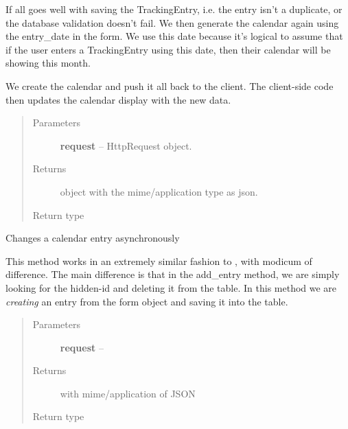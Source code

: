 \documentclass[letterpaper,10pt,english]{sphinxmanual}
\begin{document}
\begin{fulllineitems}
If all goes well with saving the TrackingEntry, i.e. the entry isn't a
duplicate, or the database validation doesn't fail. We then generate the
calendar again using the entry\_date in the form. We use this date because
it's logical to assume that if the user enters a TrackingEntry using this
date, then their calendar will be showing this month.

We create the calendar and push it all back to the client. The client-side
code then updates the calendar display with the new data.
\begin{quote}\begin{description}
\item[{Parameters}] \leavevmode
\textbf{request} -- HttpRequest object.

\item[{Returns}] \leavevmode
{} object with the mime/application type as
json.

\item[{Return type}] \leavevmode
{}

\end{description}\end{quote}

\end{fulllineitems}


\begin{fulllineitems}
\label{timetracker:timetracker.utils.calendar_utils.ajax_change_entry}
Changes a calendar entry asynchronously

This method works in an extremely similar fashion to {\hyperref[timetracker:timetracker.utils.calendar_utils.ajax_add_entry]{}},
with modicum of difference. The main difference is that in the add\_entry
method, we are simply looking for the hidden-id and deleting it from the
table. In this method we are \emph{creating} an entry from the form object
and saving it into the table.
\begin{quote}\begin{description}
\item[{Parameters}] \leavevmode
\textbf{request} -- 

\item[{Returns}] \leavevmode
{} with mime/application of JSON

\item[{Return type}] \leavevmode
{}

\end{description}\end{quote}

\end{fulllineitems}
\end{document}
